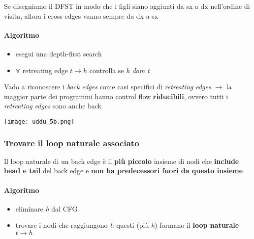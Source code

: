\begin{emphasize}
    Se disegniamo il DFST in modo che i figli siano aggiunti da sx a dx nell'ordine di visita, allora i cross edges vanno sempre da dx a sx
\end{emphasize}

\noindent \begin{minipage}[c]{.67\textwidth}
\paragraph{Algoritmo}

\begin{itemize}
  \item esegui una depth-first search
  \item $\forall$ retreating edge $t \rightarrow h$ controlla se \textit{h dom t}
\end{itemize}


\begin{emphasize}
  Vado a riconoscere i \textit{back edges} come casi specifici di \textit{retreating edges} $\rightarrow$ la maggior parte dei programmi hanno control flow \textbf{riducibili}, ovvero tutti i \textit{retreating edges} sono anche back
\end{emphasize}
\end{minipage}\hfill
\begin{minipage}[c]{.3\textwidth}
\texttt{[image: uddu\_5b.png]}
\end{minipage}

\subsubsection{Trovare il loop naturale associato}

Il loop naturale di un back edge \`e il \textbf{pi\`u piccolo} insieme di nodi che \textbf{include head e tail} del back edge e \textbf{non ha predecessori fuori da questo insieme} 

\paragraph{Algoritmo}
\begin{itemize}
  \item eliminare \textit{h} dal CFG
  \item trovare i nodi che raggiungono \textit{t}: questi (pi\`u \textit{h}) formano il \textbf{loop naturale} $t \rightarrow h$
\end{itemize}



